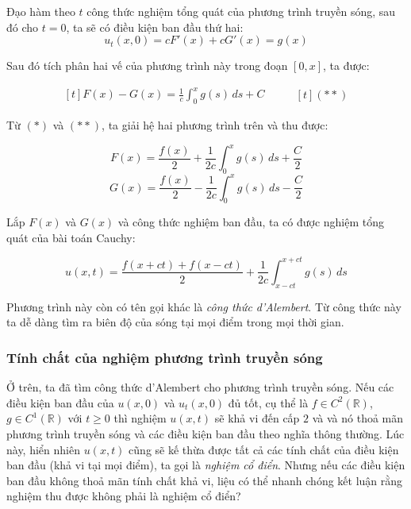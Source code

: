\documentclass[a4paper]{article}
\begin{document}
Đạo hàm theo $t$ công thức nghiệm tổng quát của phương trình truyền sóng, sau đó cho $t = 0$, ta sẽ có điều kiện ban đầu thứ hai:
\begin{equation*}
u_t(x,0) = cF'(x) + cG'(x) = g(x)
\end{equation*}

Sau đó tích phân hai vế của phương trình này trong đoạn $[0, x]$, ta được:

\begin{equation*}
\begin{aligned}[t]
F(x) - G(x) = \frac{1}{c} \int_{0}^{x} g(s) \,ds + C
\end{aligned}
\qquad
\begin{aligned}[t]
(**)
\end{aligned}
\end{equation*}

Từ $(*)$ và $(**)$, ta giải hệ hai phương trình trên và thu được:

\begin{equation*}
F(x) = \frac{f(x)}{2} + \frac{1}{2c} \int_{0}^{x} g(s) \,ds + \frac{C}{2}
\end{equation*}
\begin{equation*}
G(x) = \frac{f(x)}{2}  - \frac{1}{2c} \int_{0}^{x} g(s) \,ds - \frac{C}{2}
\end{equation*}

Lắp $F(x)$ và $G(x)$ và công thức nghiệm ban đầu, ta có được nghiệm tổng quát của bài toán Cauchy:

\begin{equation*}
u(x, t) = \frac{f(x + ct) + f(x - ct)}{2} + \frac{1}{2c} \int_{x - ct}^{x + ct} g(s) \, ds
\end{equation*}

Phương trình này còn có tên gọi khác là \emph{công thức d'Alembert}. Từ công thức này ta dễ dàng tìm ra biên độ của sóng tại mọi điểm trong mọi thời gian.

\subsubsection{Tính chất của nghiệm phương trình truyền sóng}

Ở trên, ta đã tìm công thức d'Alembert cho phương trình truyền sóng. Nếu các điều kiện ban đầu của $u(x, 0)$ và $u_t(x, 0)$ đủ tốt, cụ thể là $f \in C^2(\mathbb{R})$, $g \in C^1(\mathbb{R})$ với $t \geq 0$ thì nghiệm $u(x, t)$ sẽ khả vi đến cấp $2$ và và nó thoả mãn phương trình truyền sóng và các điều kiện ban đầu theo nghĩa thông thường. Lúc này, hiển nhiên $u(x, t)$ cũng sẽ kế thừa được tất cả các tính chất của điều kiện ban đầu (khả vi tại mọi điểm), ta gọi là \emph{nghiệm cổ điển}. Nhưng nếu các điều kiện ban đầu không thoả mãn tính chất khả vi, liệu có thể nhanh chóng kết luận rằng nghiệm thu được không phải là nghiệm cổ điển?
\end{document}
